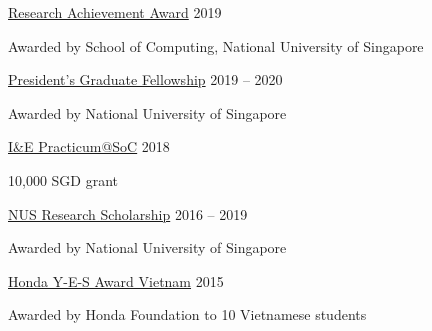 
\begin{cvhonors}

\cvhonorr
    {\href{https://www.comp.nus.edu.sg/programmes/pg/awards/deans/}{Research Achievement Award}} %
    {2019} %
    {
      \begin{cvitems} %
        \item {Awarded by School of Computing, National University of Singapore}
      \end{cvitems}
    }


\cvhonorr
    {\href{http://www.nus.edu.sg/admissions/graduate-studies/scholarships-financial-aid-and-fees/scholarships-awards/president's-graduate-fellowship.html}{President's Graduate Fellowship}} %
    {2019 -- 2020} %
    {
      \begin{cvitems} %
        \item {Awarded by National University of Singapore}
      \end{cvitems}
    }



\cvhonorr
    {\href{https://www.comp.nus.edu.sg/entrepreneurship/awards/winners/}{I\&E Practicum@SoC}} %
    {2018} %
    {
      \begin{cvitems} %
        \item {10,000 SGD grant}
      \end{cvitems}
    }

\cvhonorr
    {\href{http://www.nus.edu.sg/admissions/graduate-studies/scholarships-financial-aid-and-fees/scholarships-awards/nus-research-scholarship.html}{NUS Research Scholarship} } %
    {2016 -- 2019} %
    {
      \begin{cvitems} %
        \item {Awarded by National University of Singapore}
      \end{cvitems}
    }

  \cvhonorr
    {\href{http://www.hondafoundation.jp/yes/index_en/184}{Honda Y-E-S Award Vietnam}} %
    {2015} %
    {
    \begin{cvitems} %
        \item {Awarded by Honda Foundation to 10 Vietnamese students}
      \end{cvitems}
    }


\end{cvhonors}
